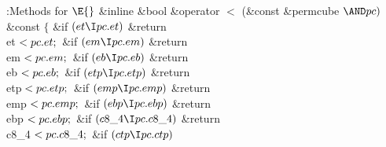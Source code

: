 \Y\B\4:Methods for \X${}\E{}$\6
\&{inline} \&{bool} \&{operator} $<$ (\&{const} \&{permcube} ${}{\AND}\\{pc})$ %
\&{const} \6
${}\{{}$\1\6
\&{if} ${}(\\{et}\I\\{pc}.\\{et}){}$\1\5
\&{return} \\{et}${}<\\{pc}.\\{et};{}$\2\6
\&{if} ${}(\\{em}\I\\{pc}.\\{em}){}$\1\5
\&{return} \\{em}${}<\\{pc}.\\{em};{}$\2\6
\&{if} ${}(\\{eb}\I\\{pc}.\\{eb}){}$\1\5
\&{return} \\{eb}${}<\\{pc}.\\{eb};{}$\2\6
\&{if} ${}(\\{etp}\I\\{pc}.\\{etp}){}$\1\5
\&{return} \\{etp}${}<\\{pc}.\\{etp};{}$\2\6
\&{if} ${}(\\{emp}\I\\{pc}.\\{emp}){}$\1\5
\&{return} \\{emp}${}<\\{pc}.\\{emp};{}$\2\6
\&{if} ${}(\\{ebp}\I\\{pc}.\\{ebp}){}$\1\5
\&{return} \\{ebp}${}<\\{pc}.\\{ebp};{}$\2\6
\&{if} ${}(\\{c8\_4}\I\\{pc}.\\{c8\_4}){}$\1\5
\&{return} \\{c8\_4}${}<\\{pc}.\\{c8\_4};{}$\2\6
\&{if} ${}(\\{ctp}\I\\{pc}.\\{ctp}){}$\1\5
